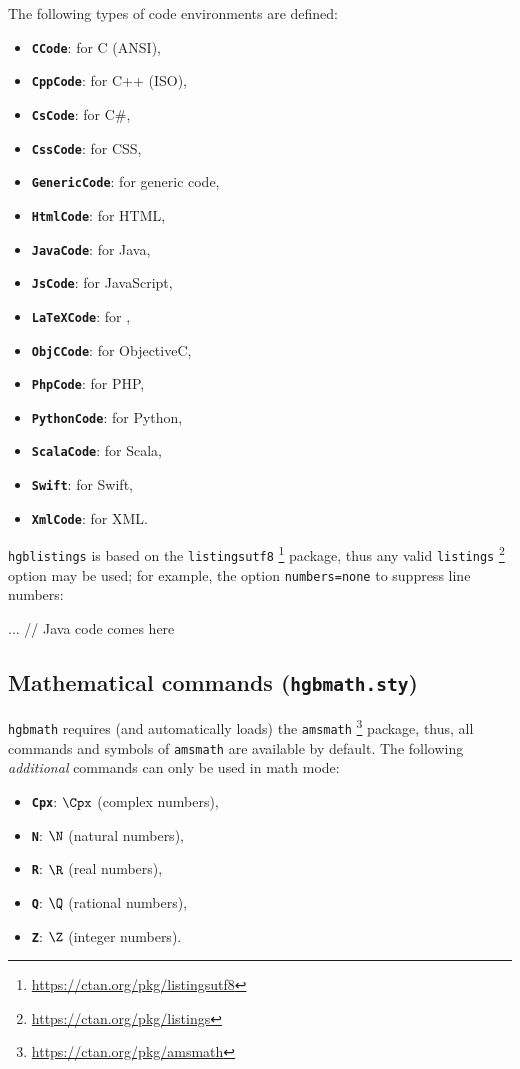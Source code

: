 \documentclass[language=english]{hgbarticle}
\begin{document}
The following types of code environments are defined:%
%
\begin{itemize}
    \item \textbf{\texttt{CCode}}: for C (ANSI),
    \item \textbf{\texttt{CppCode}}: for C++ (ISO),
    \item \textbf{\texttt{CsCode}}: for C\#,
    \item \textbf{\texttt{CssCode}}: for CSS,
    \item \textbf{\texttt{GenericCode}}: for generic code,
    \item \textbf{\texttt{HtmlCode}}: for HTML,
    \item \textbf{\texttt{JavaCode}}: for Java,
    \item \textbf{\texttt{JsCode}}: for JavaScript,
    \item \textbf{\texttt{LaTeXCode}}: for \latex,
    \item \textbf{\texttt{ObjCCode}}: for ObjectiveC,
    \item \textbf{\texttt{PhpCode}}: for PHP,
    \item \textbf{\texttt{PythonCode}}: for Python,
    \item \textbf{\texttt{ScalaCode}}: for Scala,
    \item \textbf{\texttt{Swift}}: for Swift,
    \item \textbf{\texttt{XmlCode}}: for XML.
\end{itemize}
%
\texttt{hgblistings} is based on the \texttt{listingsutf8}%
\footnote{\url{https://ctan.org/pkg/listingsutf8}}
package, thus any valid \texttt{listings}%
\footnote{\url{https://ctan.org/pkg/listings}}
option may be used; for example, the option \texttt{numbers=none} to suppress
line numbers:
%
\begin{LaTeXCode}[numbers=none]
    \begin{JavaCode}[numbers=none]
    ... // Java code comes here
    \end{JavaCode}
\end{LaTeXCode}


\subsection{Mathematical commands (\texttt{hgbmath.sty})}

\texttt{hgbmath} requires (and automatically loads) the \texttt{amsmath}%
\footnote{\url{https://ctan.org/pkg/amsmath}}
package, thus, all commands and symbols of \texttt{amsmath} are available by
default. The following \emph{additional} commands can only be used in math mode:
%
\begin{itemize}
    \item \textbf{\texttt{{\bs}Cpx}}: $\Cpx$ (complex numbers),
    \item \textbf{\texttt{{\bs}N}}: $\N$ (natural numbers),
    \item \textbf{\texttt{{\bs}R}}: $\R$ (real numbers),
    \item \textbf{\texttt{{\bs}Q}}: $\Q$ (rational numbers),
    \item \textbf{\texttt{{\bs}Z}}: $\Z$ (integer numbers).
\end{itemize}
\end{document}
